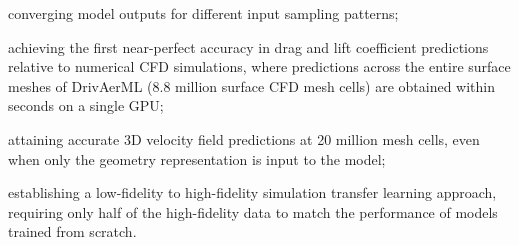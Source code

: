 \begin{enumerate*}[label={(\roman*)}]
    \item converging model outputs for different input sampling patterns;
    \item achieving the first near-perfect accuracy in drag and lift coefficient predictions relative to numerical \ac{CFD} simulations, where predictions across the entire surface meshes of DrivAerML (8.8 million surface \ac{CFD} mesh cells) are obtained within seconds on a single GPU;
    \item attaining accurate 3D velocity field predictions at 20 million mesh cells, even when only the geometry representation is input to the model;
    \item establishing a low-fidelity to high-fidelity simulation transfer learning approach, requiring only half of the high-fidelity data to match the performance of models trained from scratch.
\end{enumerate*}
